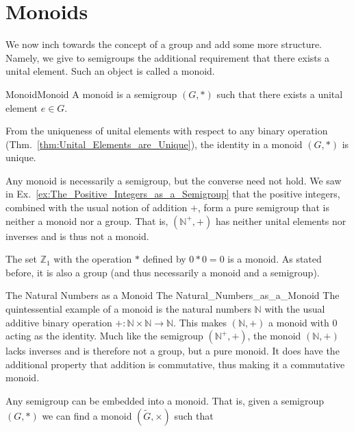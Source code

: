 \section{Monoids}
    We now inch towards the concept of a group and add some more structure.
    Namely, we give to semigroups the additional requirement that there exists
    a unital element. Such an object is called a monoid.
    \begin{fdefinition}{Monoid}{Monoid}
        A \gls{monoid} is a \gls{semigroup} $(G,*)$ such that there exists a
        \gls{unital element} $e\in{G}$.
    \end{fdefinition}
    From the uniqueness of unital elements with respect to any binary operation
    (Thm.~\ref{thm:Unital_Elements_are_Unique}), the identity in a monoid
    $(G,*)$ is unique.
    \begin{example}
        Any monoid is necessarily a semigroup, but the converse need not hold.
        We saw in Ex.~\ref{ex:The_Positive_Integers_as_a_Semigroup} that the
        positive integers, combined with the usual notion of addition $+$, form
        a pure semigroup that is neither a monoid nor a group. That is,
        $(\mathbb{N}^{+},+)$ has neither unital elements nor inverses and is
        thus not a monoid.
    \end{example}
    \begin{example}
        The set $\mathbb{Z}_{1}$ with the operation $*$ defined by $0*0=0$ is
        a monoid. As stated before, it is also a group (and thus necessarily a
        monoid and a semigroup).
    \end{example}
    \begin{fexample}{The Natural Numbers as a Monoid}
                    {The Natural_Numbers_as_a_Monoid}
        The quintessential example of a monoid is the natural numbers
        $\mathbb{N}$ with the usual additive binary operation
        $+:\mathbb{N}\times\mathbb{N}\rightarrow\mathbb{N}$. This makes
        $(\mathbb{N},+)$ a monoid with 0 acting as the identity. Much like the
        semigroup $(\mathbb{N}^{+},+)$, the monoid $(\mathbb{N},+)$ lacks
        inverses and is therefore not a group, but a pure monoid. It does have
        the additional property that addition is commutative, thus making it a
        \gls{commutative monoid}.
    \end{fexample}
    Any semigroup can be embedded into a monoid. That is, given a semigroup
    $(G,*)$ we can find a monoid $(\tilde{G},\times)$ such that
